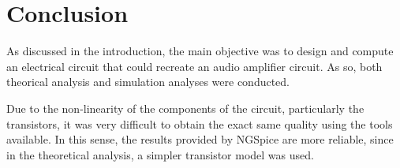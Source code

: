 \newpage
\vspace{4cm}
\section{Conclusion}
\label{con}

\par As discussed in the introduction, the main objective was to design and compute an electrical circuit that could recreate an audio amplifier circuit. As so, both theorical analysis and simulation analyses were conducted. 

\par Due to the non-linearity of the components of the circuit, particularly the transistors, it was very difficult to obtain the exact same quality using the tools available. In this sense, the results provided by NGSpice are more reliable, since in the theoretical analysis, a simpler transistor model was used.
